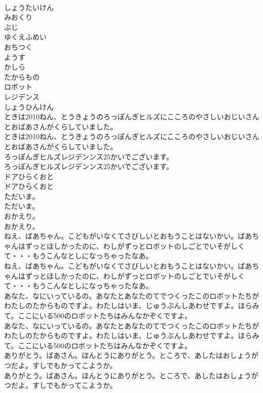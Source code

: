 \documentclass[8pt]{extreport}
\begin{document}
\begin{CJK}{UTF8}{min}
\\	しょうたいけん
\\	みおくり
\\	ぶじ
\\	ゆくえふめい
\\	おちつく
\\	ようす
\\	かしら
\\	たからもの
\\	ロボット
\\	レジデンス
\\	しょうひんけん
\\	ときは2010ねん、とうきょうのろっぽんぎヒルズにこころのやさしいおじいさんとおばあさんがくらしていました。
\\	ときは2010ねん、とうきょうのろっぽんぎヒルズにこころのやさしいおじいさんとおばあさんがくらしていました。
\\	ろっぽんぎヒルズレジデンンス25かいでございます。
\\	ろっぽんぎヒルズレジデンンス25かいでございます。
\\	ドアひらくおと
\\	ドアひらくおと
\\	ただいま。
\\	ただいま。
\\	おかえり。
\\	おかえり。
\\	ねえ、ばあちゃん。こどもがいなくてさびしいとおもうことはないかい。ばあちゃんはずっとほしかったのに、わしがずっとロボットのしごとでいそがしくて・・・もうこんなとしになっちゃったなあ。
\\	ねえ、ばあちゃん。こどもがいなくてさびしいとおもうことはないかい。ばあちゃんはずっとほしかったのに、わしがずっとロボットのしごとでいそがしくて・・・もうこんなとしになっちゃったなあ。
\\	あなた、なにいっているの。あなたとあなたのてでつくったこのロボットたちがわたしのたからものですよ。わたしはいま、じゅうぶんしあわせですよ。ほらみて。ここにいる500のロボットたちはみんなかぞくですよ。
\\	あなた、なにいっているの。あなたとあなたのてでつくったこのロボットたちがわたしのたからものですよ。わたしはいま、じゅうぶんしあわせですよ。ほらみて。ここにいる500のロボットたちはみんなかぞくですよ。
\\	ありがとう。ばあさん。ほんとうにありがとう。ところで、あしたはおしょうがつだよ。すしでもかってこようか。
\\	ありがとう。ばあさん。ほんとうにありがとう。ところで、あしたはおしょうがつだよ。すしでもかってこようか。

\end{CJK}
\end{document}
